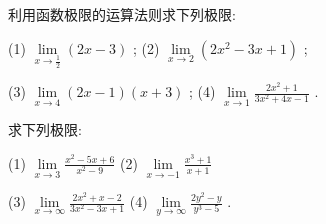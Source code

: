 \documentclass[lang=cn,newtx,10pt,scheme=chinese]{elegantbook}
\begin{document}
\begin{problemset}[练习]
\item 利用函数极限的运算法则求下列极限:

(1) \(\mathop{\lim }\limits_{{x \rightarrow \frac{1}{2}}}\left( {{2x} - 3}\right)\) ; (2) \(\mathop{\lim }\limits_{{x \rightarrow 2}}\left( {2{x}^{2} - {3x} + 1}\right)\) ;

(3) \(\mathop{\lim }\limits_{{x \rightarrow 4}}\left( {{2x} - 1}\right) \left( {x + 3}\right)\) ; (4) \(\mathop{\lim }\limits_{{x \rightarrow 1}}\frac{2{x}^{2} + 1}{3{x}^{2} + {4x} - 1}\) .

\item 求下列极限:

(1) \(\mathop{\lim }\limits_{{x \rightarrow 3}}\frac{{x}^{2} - {5x} + 6}{{x}^{2} - 9}\) (2) \(\mathop{\lim }\limits_{{x \rightarrow - 1}}\frac{{x}^{3} + 1}{x + 1}\)

(3) \(\mathop{\lim }\limits_{{x \rightarrow \infty }}\frac{2{x}^{2} + x - 2}{3{x}^{2} - {3x} + 1}\) (4) \(\mathop{\lim }\limits_{{y \rightarrow \infty }}\frac{2{y}^{2} - y}{{y}^{3} - 5}\) .

\end{problemset}
\end{document}
